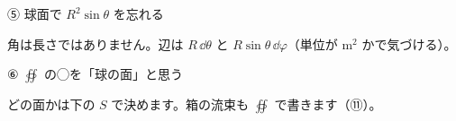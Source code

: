 \begingroup{}%
\noindent\begin{minipage}[t]{0.485\linewidth}\vspace{0pt}
\begin{tsumazuki}{⑤ 球面で $R^2\sin\theta$ を忘れる}
\raggedright{}
角は長さではありません。辺は $R\,\dd\theta$ と $R\sin\theta\,\dd\varphi$（単位が m$^2$ かで気づける）。
\end{tsumazuki}
\end{minipage}\hfill
\begin{minipage}[t]{0.485\linewidth}\vspace{0pt}
\begin{tsumazuki}{⑥ $\oiint$ の◯を「球の面」と思う}
\raggedright{}
どの面かは下の $S$ で決めます。箱の流束も $\oiint$ で書きます（⑪）。
\end{tsumazuki}
\end{minipage}\par
\endgroup

